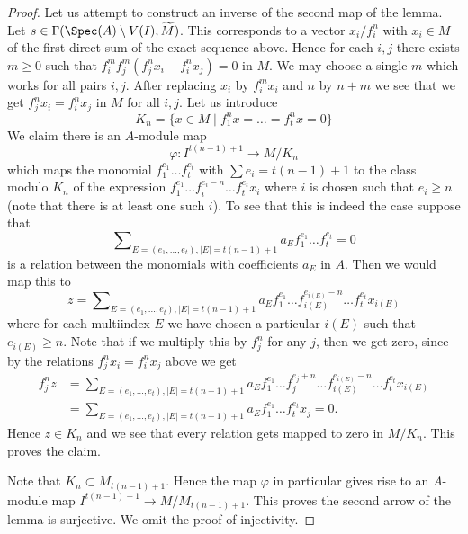 \begin{proof}
\medskip\noindent
Let us attempt to construct an inverse of the second map of the lemma.
Let $s \in \Gamma(\Spec(A) \setminus V(I), \widetilde{M})$.
This corresponds to a vector $x_i/f_i^n$ with $x_i \in M$ of the
first direct sum of the exact sequence above.
Hence for each $i, j$ there exists $m \geq 0$
such that $f_i^m f_j^m (f_j^n x_i - f_i^n x_j) = 0$ in $M$.
We may choose a single $m$ which works for all pairs $i, j$.
After replacing $x_i$ by $f_i^mx_i$ and $n$ by $n + m$ we see
that we get $f_j^nx_i = f_i^nx_j$ in $M$ for all $i, j$.
Let us introduce
$$
K_n = \{x \in M \mid f_1^nx = \ldots = f_t^nx = 0\}
$$
We claim there is an $A$-module map
$$
\varphi :
I^{t(n - 1) + 1}
\longrightarrow
M/K_n
$$
which maps the monomial
$f_1^{e_1} \ldots f_t^{e_t}$ with $\sum e_i = t(n - 1) + 1$
to the class modulo $K_n$ of the expression
$f_1^{e_1} \ldots f_i^{e_i - n} \ldots f_t^{e_t}x_i$
where $i$ is chosen such that $e_i \geq n$ (note that there
is at least one such $i$).
To see that this is indeed the case suppose that
$$
\sum\nolimits_{E = (e_1, \ldots, e_t), |E| = t(n - 1) + 1}
a_E f_1^{e_1} \ldots f_t^{e_t} = 0
$$
is a relation between the monomials with coefficients $a_E$ in $A$.
Then we would map this to
$$
z =
\sum\nolimits_{E = (e_1, \ldots, e_t), |E| = t(n - 1) + 1}
a_E f_1^{e_1} \ldots f_{i(E)}^{e_{i(E)} - n} \ldots f_t^{e_t}x_{i(E)}
$$
where for each multiindex $E$ we have chosen a particular $i(E)$
such that $e_{i(E)} \geq n$.
Note that if we multiply this by $f_j^n$ for any $j$, then
we get zero, since by the relations $f_j^nx_i = f_i^nx_j$ above we get
\begin{align*}
f_j^nz & = \sum\nolimits_{E = (e_1, \ldots, e_t), |E| = t(n - 1) + 1}
a_E f_1^{e_1} \ldots f_j^{e_j + n}
\ldots f_{i(E)}^{e_{i(E)} - n} \ldots f_t^{e_t}x_{i(E)} \\
& =
\sum\nolimits_{E = (e_1, \ldots, e_t), |E| = t(n - 1) + 1}
a_E f_1^{e_1} \ldots f_t^{e_t}x_j
= 0.
\end{align*}
Hence $z \in K_n$ and we see that every relation gets mapped to zero
in $M/K_n$. This proves the claim.

\medskip\noindent
Note that $K_n \subset M_{t(n - 1) + 1}$. Hence the
map $\varphi$ in particular gives rise to an $A$-module map
$I^{t(n - 1) + 1} \to M/M_{t(n - 1) + 1}$.
This proves the second arrow of the lemma is surjective.
We omit the proof of injectivity.
\end{proof}


